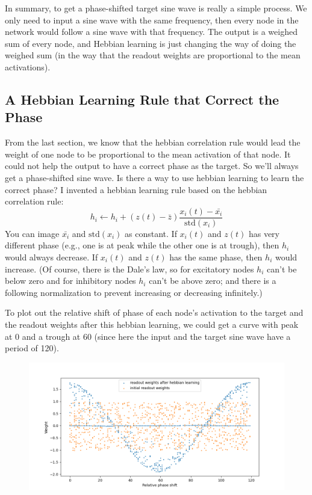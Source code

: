 \documentclass[12pt, a4paper]{article}
\begin{document}
In summary, to get a phase-shifted target sine wave is really a simple process. We only need to input a sine wave with the same frequency, then every node in the network would follow a sine wave with that frequency. The output is a weighed sum of every node, and Hebbian learning is just changing the way of doing the weighed sum (in the way that the readout weights are proportional to the mean activations).

\newpage

\subsection*{A Hebbian Learning Rule that Correct the Phase}

From the last section, we know that the hebbian correlation rule would lead the weight of one node to be proportional to the mean activation of that node. It could not help the output to have a correct phase as the target. So we'll always get a phase-shifted sine wave. Is there a way to use hebbian learning to learn the correct phase? I invented a hebbian learning rule based on the hebbian correlation rule: $$h_i \leftarrow h_i + (z(t) - \bar{z}) \frac{x_i(t) - \bar{x_i}}{\text{std}(x_i)}$$
You can image $\bar{x_i}$ and $\text{std}(x_i)$ as constant. If $x_i(t)$ and $z(t)$ has very different phase (e.g., one is at peak while the other one is at trough), then $h_i$ would always decrease. If $x_i(t)$ and $z(t)$ has the same phase, then $h_i$ would increase. (Of course, there is the Dale's law, so for excitatory nodes $h_i$ can't be below zero and for inhibitory nodes $h_i$ can't be above zero; and there is a following normalization to prevent increasing or decreasing infinitely.)

To plot out the relative shift of phase of each node's activation to the target and the readout weights after this hebbian learning, we could get a curve with peak at 0 and a trough at 60 (since here the input and the target sine wave have a period of 120). 

\begin{figure}[H]
    \centering
    \includegraphics[width=\textwidth]{RNN/FORCE/fig/FORCE_phase_outweights.png}
\end{figure}
\end{document}
